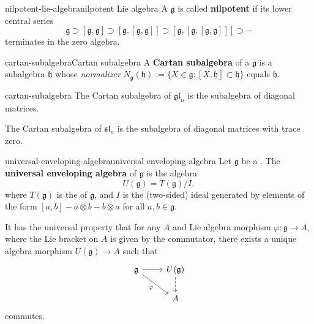 \begin{topic}{nilpotent-lie-algebra}{nilpotent Lie algebra}
    A  $\mathfrak{g}$ is called \textbf{nilpotent} if its lower central series
    \[ \mathfrak{g} \supset [\mathfrak{g}, \mathfrak{g}] \supset [\mathfrak{g}, [\mathfrak{g}, \mathfrak{g}]] \supset [\mathfrak{g}, [\mathfrak{g}, [\mathfrak{g}, \mathfrak{g}]]] \supset \cdots \]
    terminates in the zero algebra.
\end{topic}

\begin{topic}{cartan-subalgebra}{Cartan subalgebra}
    A \textbf{Cartan subalgebra} of a  $\mathfrak{g}$ is a  subalgebra $\mathfrak{h}$ whose \textit{normalizer} $N_\mathfrak{g}(\mathfrak{h}) := \{ X \in \mathfrak{g} : [X, \mathfrak{h}] \subset \mathfrak{h} \}$ equals $\mathfrak{h}$.
\end{topic}

\begin{example}{cartan-subalgebra}
    The Cartan subalgebra of $\mathfrak{gl}_n$ is the subalgebra of diagonal matrices.
    
    The Cartan subalgebra of $\mathfrak{sl}_n$ is the subalgebra of diagonal matrices with trace zero.
\end{example}

\begin{topic}{universal-enveloping-algebra}{universal enveloping algebra}
    Let $\mathfrak{g}$ be a . The \textbf{universal enveloping algebra} of $\mathfrak{g}$ is the algebra
    \[ U(\mathfrak{g}) = T(\mathfrak{g}) / I , \]
    where $T(\mathfrak{g})$ is the  of $\mathfrak{g}$, and $I$ is the (two-sided) ideal generated by elements of the form $[a, b] - a \otimes b - b \otimes a$ for all $a, b \in \mathfrak{g}$.
    
    It has the universal property that for any  $A$ and Lie algebra morphism $\varphi : \mathfrak{g} \to A$, where the Lie bracket on $A$ is given by the commutator, there exists a unique algebra morphism $U(\mathfrak{g}) \to A$ such that
    \[ \begin{tikzcd} \mathfrak{g} \arrow{r} \arrow[swap]{dr}{\varphi} & U(\mathfrak{g}) \arrow[dashed]{d} \\ & A \end{tikzcd} \]
    commutes.
\end{topic}

